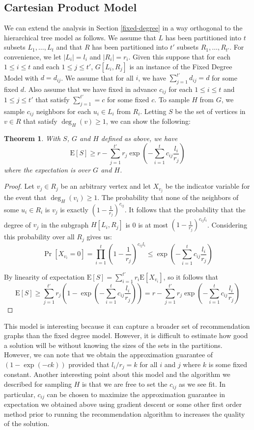 \documentclass[]{article}
\newcommand{\E}{\text{E}}
\newtheorem{thm}{Theorem}
\begin{document}
\subsection{Cartesian Product Model}
\label{cartesian}
We can extend the analysis in Section \ref{fixed-degree} in a way
orthogonal to the hierarchical tree model as follows. We assume that
$L$ has been partitioned into $t$ subsets $L_1,\ldots, L_t$ and
that $R$ has been partitioned into $t'$ subsets $R_1,\ldots,
R_{t'}$. For convenience, we let $|L_i| = l_i$ and $|R_i|=r_i$. Given
this suppose that for each $1\leq i\leq t$ and each $1\leq j\leq t'$,
$G[L_i, R_j]$ is an instance of the Fixed Degree Model with
$d=d_{ij}$. We assume that for all $i$, we have $\sum_{j=1}^{t'}
d_{ij} = d$ for some fixed $d$. Also assume that we have fixed in
advance $c_{ij}$ for each $1\leq i\leq t$ and $1\leq j\leq t'$ that
satisfy $\sum_{j=1}^{t'} = c$ for some fixed $c$. To sample $H$ from
$G$, we sample $c_{ij}$ neighbors for each $u_i\in L_i$ from
$R_i$. Letting $S$ be the set of vertices in $v\in R$ that satisfy
$\deg_H(v)\geq 1$, we can show the following:

\begin{thm}
With $S$, $G$ and $H$ defined as above, we have
\[ \E[S] \geq r - \sum_{j=1}^{t'} r_j \exp\left(-\sum_{i=1}^t c_{ij} \frac{l_i}{r_j}\right)\]
where the expectation is over $G$ and $H$.
\end{thm}
\begin{proof}
Let $v_j \in R_j$ be an arbitrary vertex and let $X_{v_j}$ be the
indicator variable for the event that $\deg_H(v_i) \geq 1$. The
probability that none of the neighbors of some $u_i\in R_i$ is $v_j$
is exactly $(1-\frac{1}{r_j})^{c_{ij}}$. It follows that the
probability that the degree of $v_j$ in the subgraph $H[L_i,R_j]$ is 0
is at most $(1-\frac{1}{r_j})^{c_{ij}l_i}$. Considering this
probability over all $R_j$ gives us:
\[ \Pr[X_{v_i} = 0] = \prod_{i=1}^{t} \left(1-\frac{1}{r_j}\right)^{c_{ij} l_i} \leq \exp\left(-\sum_{i=1}^t c_{ij} \frac{l_i}{r_j}\right)\]

By linearity of expectation $\E[S] = \sum_{i=1}^{t'} r_i \E[X_{v_i}]$,
so it follows that
\[ \E[S] \geq \sum_{j=1}^{t'} r_j \left(1-\exp\left(-\sum_{i=1}^t c_{ij} \frac{l_i}{r_j}\right)\right) = r - \sum_{j=1}^{t'} r_j \exp\left(-\sum_{i=1}^t c_{ij} \frac{l_i}{r_j}\right)\]
\end{proof}

This model is interesting because it can capture a broader set of
recommendation graphs than the fixed degree model. However, it is
difficult to estimate how good a solution will be without knowing
the sizes of the sets in the partitions. However, we can note that we
obtain the approximation guarantee of $(1-\exp(-ck))$ provided that
$l_i/r_j = k$ for all $i$ and $j$ where $k$ is some fixed
constant. Another interesting point about this model and the algorithm
we described for sampling $H$ is that we are free to set the $c_{ij}$
as we see fit. In particular, $c_{ij}$ can be chosen to maximize the
approximation guarantee in expectation we obtained above using
gradient descent or some other first order method prior to running the
recommendation algorithm to increases the quality of the solution.
\end{document}
